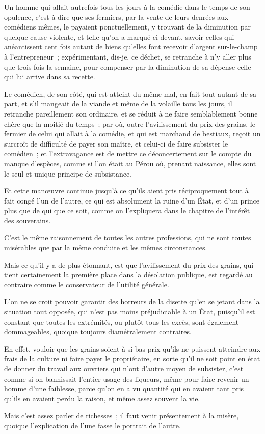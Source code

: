 \documentclass[french,twoside]{book} %
\begin{document}
Un homme qui allait autrefois tous les jours à la comédie dans le temps de son opulence, c’est-à-dire que ses fermiers, par la vente de leurs denrées aux comédiens mêmes, le payaient ponctuellement, y trouvant de la diminution par quelque cause violente, et telle qu’on a marqué ci-devant, savoir celles qui anéantissent cent fois autant de biens qu’elles font recevoir d’argent sur-le-champ à l’entrepreneur ; expérimentant, dis-je, ce déchet, se retranche à n’y aller plus que trois fois la semaine, pour compenser par la diminution de sa dépense celle qui lui arrive dans sa recette.\par
Le comédien, de son côté, qui est atteint du même mal, en fait tout autant de sa part, et s’il mangeait de la viande et même de la volaille tous les jours, il retranche pareillement son ordinaire, et se réduit à ne faire semblablement bonne chère que la moitié du temps ; par où, outre l’avilissement du prix des grains, le fermier de celui qui allait à la comédie, et qui est marchand de bestiaux, reçoit un surcroît de difficulté de payer son maître, et celui-ci de faire subsister le comédien ; et l’extravagance est de mettre ce déconcertement sur le compte du manque d’espèces, comme si l’on était au Pérou où, prenant naissance, elles sont le seul et unique principe de subsistance.\par
Et cette manœuvre continue jusqu’à ce qu’ils aient pris réciproquement tout à fait congé l’un de l’autre, ce qui est absolument la ruine d’un État, et d’un prince plus que de qui que ce soit, comme on l’expliquera dans le chapitre de l’intérêt des souverains.\par
C’est le même raisonnement de toutes les autres professions, qui ne sont toutes misérables que par la même conduite et les mêmes circonstances.\par
Mais ce qu’il y a de plus étonnant, est que l’avilissement du prix des grains, qui tient certainement la première place dans la désolation publique, est regardé au contraire comme le conservateur de l’utilité générale.\par
L’on ne se croit pouvoir garantir des horreurs de la disette qu’en se jetant dans la situation tout opposée, qui n’est pas moins préjudiciable à un État, puisqu’il est constant que toutes les extrémités, ou plutôt tous les excès, sont également dommageables, quoique toujours diamétralement contraires.\par
En effet, vouloir que les grains soient à si bas prix qu’ils ne puissent atteindre aux frais de la culture ni faire payer le propriétaire, en sorte qu’il ne soit point en état de donner du travail aux ouvriers qui n’ont d’autre moyen de subsister, c’est comme si on bannissait l’entier usage des liqueurs, même pour faire revenir un homme d’une faiblesse, parce qu’on en a vu quantité qui en avaient tant pris qu’ils en avaient perdu la raison, et même assez souvent la vie.\par
Mais c’est assez parler de richesses ; il faut venir présentement à la misère, quoique l’explication de l’une fasse le portrait de l’autre.
\end{document}
